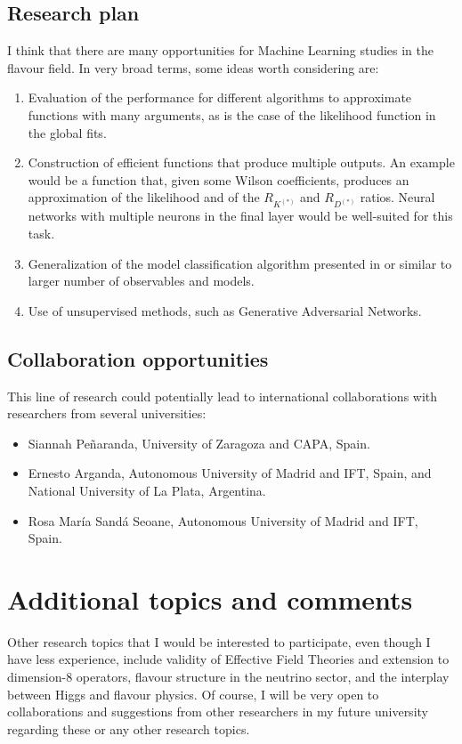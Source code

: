 \documentclass[combined.tex]{subfiles}
\begin{document}
\subsection{Research plan}
I think that there are many opportunities for Machine Learning studies in the flavour field. In very broad terms, some ideas worth considering are:
\begin{enumerate}
\item Evaluation of the performance for different algorithms to approximate functions with many arguments, as is the case of the likelihood function in the global fits.
\item Construction of efficient functions that produce multiple outputs. An example would be a function that, given some Wilson coefficients, produces an approximation of the likelihood and of the $R_{K^{(*)}}$ and $R_{D^{(*)}} $ ratios. Neural networks with multiple neurons in the final layer would be well-suited for this task.
\item Generalization of the model classification algorithm presented in \cite{Bhattacharya:2020vme} or similar to larger number of observables and models.
\item Use of unsupervised methods, such as Generative Adversarial Networks.
\end{enumerate}

\subsection{Collaboration opportunities}
This line of research could potentially lead to international collaborations with researchers from several universities:
\begin{itemize}
  \item Siannah Peñaranda, University of Zaragoza and CAPA, Spain.
  \item Ernesto Arganda, Autonomous University of Madrid and IFT, Spain, and National University of La Plata, Argentina.
  \item Rosa María Sandá Seoane, Autonomous University of Madrid and IFT, Spain.
\end{itemize}

\section{Additional topics and comments}
Other research topics that I would be interested to participate, even though I have less experience, include validity of Effective Field Theories and extension to dimension-8 operators, flavour structure in the neutrino sector, and the interplay between Higgs and flavour physics. Of course, I will be very open to collaborations and suggestions from other researchers in my future university regarding these or any other research topics.
\end{document}
